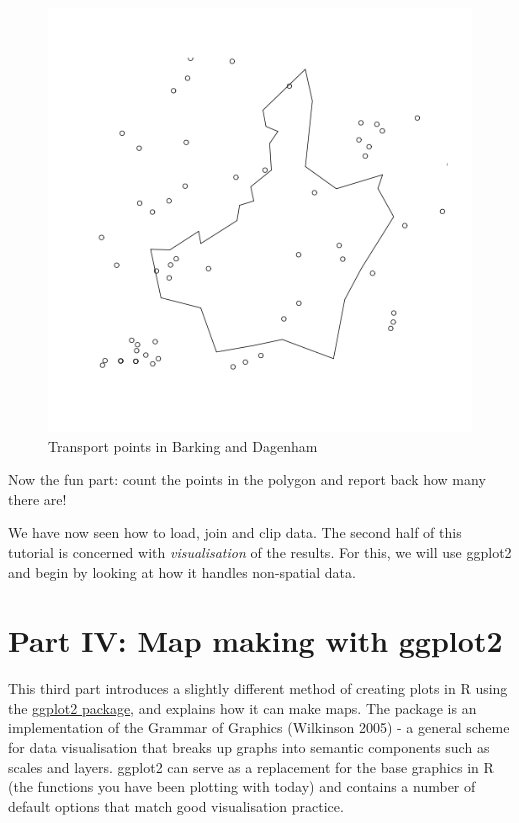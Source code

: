 \documentclass[]{article}
\begin{document}
\begin{figure}[htbp]
\centering
\includegraphics{figure/Transport_points_in_Barking_and_Dagenham.png}
\caption{Transport points in Barking and Dagenham}
\end{figure}

Now the fun part: count the points in the polygon and report back how
many there are!

We have now seen how to load, join and clip data. The second half of
this tutorial is concerned with \emph{visualisation} of the results. For
this, we will use ggplot2 and begin by looking at how it handles
non-spatial data.

\section{Part IV: Map making with
ggplot2}\label{part-iv-map-making-with-ggplot2}

This third part introduces a slightly different method of creating plots
in R using the \href{http://ggplot2.org/}{ggplot2 package}, and explains
how it can make maps. The package is an implementation of the Grammar of
Graphics (Wilkinson 2005) - a general scheme for data visualisation that
breaks up graphs into semantic components such as scales and layers.
ggplot2 can serve as a replacement for the base graphics in R (the
functions you have been plotting with today) and contains a number of
default options that match good visualisation practice.
\end{document}
